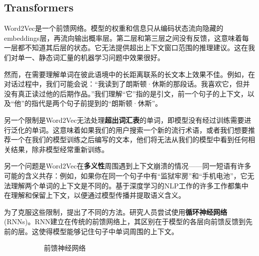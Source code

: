 \documentclass[Chinese, 11pt, table]{diazessay} %
\begin{document}
\begin{CJK}{UTF8}{gbsn}
\begin{sloppypar}
\subsection{Transformers}

Word2Vec是一个前馈网络。模型的权重和信息只从编码状态流向隐藏的embeddings层，再流向输出概率层。第二层和第三层之间没有反馈，这意味着每一层都不知道其后层的状态。它无法提供超出上下文窗口范围的推理建议。这在我们对单一、静态词汇量的机器学习问题中效果很好。

然而，在需要理解单词在彼此语境中的长距离联系的长文本上效果不佳。例如，在对话过程中，我们可能会说：“我读到了朗斯顿·休斯的那段话。我喜欢它，但并没有真正读过他的后期作品。”我们理解“它”指的是引文，前一个句子的上下文，以及“他”的指代是两个句子前提到的“朗斯顿·休斯”。

另一个限制是Word2Vec无法处理\textbf{超出词汇表}的单词，即模型没有经过训练需要进行泛化的单词。这意味着如果我们的用户搜索一个新的流行术语，或者我们想要推荐一个在我们的模型训练之后编写的文本，他们将无法从我们的模型中看到任何相关结果\citep{di2021considerations}，除非模型经常重新训练。

另一个问题是Word2Vec在\textbf{多义性}周围遇到上下文崩溃的情况——同一短语有许多可能的含义共存：例如，如果你在同一个句子中有“监狱牢房”和“手机电池”，它无法理解两个单词的上下文是不同的。基于深度学习的NLP工作的许多工作都集中在理解和保留上下文，以便通过模型传播并提取语义含义。

为了克服这些限制，提出了不同的方法。研究人员尝试使用\textbf{循环神经网络}(RNNs)。RNN建立在传统的前馈网络上，其区别在于模型的各层向前馈反馈到先前的层。这使得模型能够记住句子中单词周围的上下文。

\begin{figure}[H]
\centering
\begin{subfigure}[b]{0.4\linewidth}
\caption{前馈神经网络}
\end{subfigure}
\begin{subfigure}[b]{0.4\linewidth}
\begin{tikzpicture}[
    shorten >=1pt,
    draw=black,
    node distance=2.5cm,line width=2pt,
    input/.style={draw=black, circle, fill=black!30, minimum size=1cm},
    cell/.style={draw=black, rectangle, rounded corners=3mm, minimum width=3cm,
        		 minimum height=1.5cm, fill=black!10},
    pre/.style={->},
    post/.style={<-}
    ]


\end{tikzpicture}
\end{subfigure}
\end{figure}
\end{sloppypar}
\end{CJK}
\end{document}
